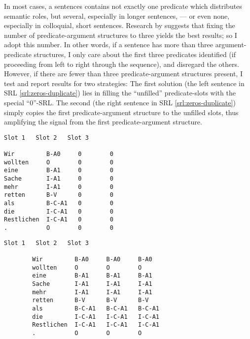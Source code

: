 In most cases, a sentences contains not exactly one predicate which distributes semantic roles,
but several, especially in longer sentences, --- or even none, especially in colloquial, short
sentences. Research by \citeauthor{zhang2019semantics} suggests that fixing the number of
predicate-argument structures to three yields the best results; so I adopt this number. In
other words, if a sentence has more than three argument-predicate structures, I only care about
the first three predicates identified (if proceeding from left to right through the sequence),
and disregard the others. However, if there are fewer than three predicate-argument structures
present, I test and report results for two strategies: The first solution (the left sentence
in SRL \ref{srl:zeros-duplicate}) lies in filling the ``unfilled'' predicate-slots with the
special ``0''-SRL. The second (the right sentence in SRL \ref{srl:zeros-duplicate}) simply
copies the first predicate-argument structure to the unfilled slots, thus amplifying the signal
from the first predicate-argument structure.


\begingroup
\begin{srl}[!h]
  \begin{minipage}{0.45\linewidth}
  \vspace{0pt}
    \begin{BVerbatim}[commandchars=\\\{\}, fontsize=\footnotesize]
            Slot 1   Slot 2   Slot 3

Wir         B-A0     0        0
wollten     O        0        0
eine        B-A1     0        0
Sache       I-A1     0        0
mehr        I-A1     0        0
retten      B-V      0        0
als         B-C-A1   0        0
die         I-C-A1   0        0
Restlichen  I-C-A1   0        0
.           O        0        0
      \end{BVerbatim}
  \end{minipage}
  \begin{minipage}{0.45\linewidth}
  \vspace{0pt}
    \begin{BVerbatim}[commandchars=\\\{\}, fontsize=\footnotesize]
                    Slot 1   Slot 2   Slot 3

        Wir         B-A0     B-A0     B-A0
        wollten     O        O        O
        eine        B-A1     B-A1     B-A1
        Sache       I-A1     I-A1     I-A1
        mehr        I-A1     I-A1     I-A1
        retten      B-V      B-V      B-V
        als         B-C-A1   B-C-A1   B-C-A1
        die         I-C-A1   I-C-A1   I-C-A1
        Restlichen  I-C-A1   I-C-A1   I-C-A1
        .           O        O        O
    \end{BVerbatim}
  \end{minipage}
\end{srl}
  \label{srl:zeros-duplicate}
\endgroup

